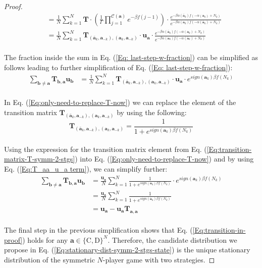 \documentclass[11pt]{article}
\theoremstyle{plainCl1}
\theoremstyle{plainCl2}
\newcommand{\abf}{\mathbf{a}}
\newcommand{\bbf}{\mathbf{b}}
\newcommand{\T}{\mathbf{T}}
\newcommand{\ubf}{\mathbf{u}}
\newcommand{\C}{\mathrm{C}}
\newcommand{\D}{\mathrm{D}}
\begin{document}
\begin{proof}
\begin{align}
&= \frac{1}{N} \sum_{k=1}^N  \T \cdot \left( \frac{1}{\Gamma} \prod_{j=1}^{\mathcal{C}(\abf)} e^{-\beta f(j-1)}\right) \cdot \frac{e^{-\beta \alpha(\bar{\abf}_k)f(-\alpha(\abf_k)+ N_k)}}{e^{-\beta \alpha(\abf_k)f(-\alpha(\bar{\abf}_k) +N_k)}} \\[10pt]
&= \frac{1}{N} \sum_{k=1}^N  \T_{(\bar{\abf}_k, \abf_{-k}),(\abf_k, \abf_{-k})} \cdot \ubf_\abf \cdot \frac{e^{-\beta \alpha(\bar{\abf}_k)f(-\alpha(\abf_k)+ N_k)}}{e^{-\beta \alpha(\abf_k)f(-\alpha(\bar{\abf}_k) +N_k)}} \label{Eq: last-step-w-fraction} 
\end{align}
\\ \noindent The fraction inside the sum in  Eq. (\ref{Eq: last-step-w-fraction}) can be simplified as follows leading to further simplification of Eq. (\ref{Eq: last-step-w-fraction}):
\begin{align}
\sum_{\bbf \neq \abf} \T_{\bbf, \abf} \ubf_{\bbf} &= \frac{1}{N} \sum_{k=1}^N  \T_{(\bar{\abf}_k, \abf_{-k}),(\abf_k, \abf_{-k})} \cdot \ubf_\abf \cdot e^{sign(\abf_k) \beta f(N_k)} 
\label{Eq:only-need-to-replace-T-now}
\end{align}
\\ \noindent In Eq. (\ref{Eq:only-need-to-replace-T-now}) we can replace the element of the transition matrix $\T_{(\bar{\abf}_k, \abf_{-k}),(\abf_k, \abf_{-k})}$ by using the following: 
\begin{equation}
\T_{(\bar{\abf}_k, \abf_{-k}),(\abf_k, \abf_{-k})} = \frac{1}{1 + \displaystyle e^{\mathit{sign}(\abf_k) \beta f(N_k)}} 
\label{Eq:transition-matrix-T-symm-2-stgs}
\end{equation}
\\ \noindent Using the expression for the transition matrix element from Eq. (\ref{Eq:transition-matrix-T-symm-2-stgs}) into Eq. (\ref{Eq:only-need-to-replace-T-now}) and by using Eq. (\ref{Eq:T_aa_u_a term}), we can simplify further: 
\begin{align}
\sum_{\bbf \neq \abf} \T_{\bbf, \abf} \ubf_{\bbf} &= \frac{\ubf_\abf}{N} \sum_{k=1}^N \frac{1}{1 + \displaystyle e^{\mathit{sign}(\abf_k) \beta f(N_k)}} \cdot  e^{sign(\abf_k) \beta f(N_k)} \\[10pt]
&= \frac{\ubf_\abf}{N} \sum_{k=1}^N \frac{1}{1 + \displaystyle e^{\mathit{sign}(\bar{\abf}_k) \beta f(N_k)}}  \\[10pt]
&= \ubf_\abf - \ubf_\abf \T_{\abf,\abf}
\end{align}
\\ \noindent The final step in the previous simplification shows that Eq. (\ref{Eq:transition-in-proof}) holds for any $\abf \in \{\C,\D\}^N$. Therefore, the candidate distribution we propose in Eq. (\ref{Eq:stationary-dist-symm-2-stgs-state}) is the unique stationary distribution of the symmetric $N$-player game with two strategies. 
\end{proof}
\end{document}
